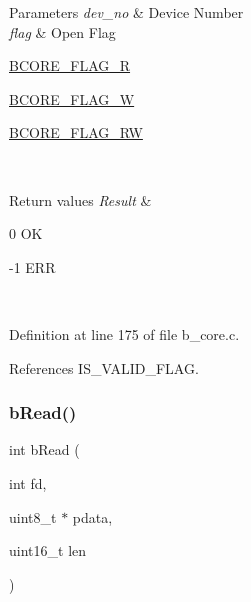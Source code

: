\begin{DoxyParams}{Parameters}
{\em dev\+\_\+no} & Device Number \\
\hline
{\em flag} & Open Flag \begin{DoxyItemize}
\item \mbox{\hyperlink{group___c_o_r_e___exported___defines_ga9632edfe3a6652c254922f0fc6e4315c}{B\+C\+O\+R\+E\+\_\+\+F\+L\+A\+G\+\_\+R}} \item \mbox{\hyperlink{group___c_o_r_e___exported___defines_ga5e134ab3ebc11db6d585cfc1a48aadf0}{B\+C\+O\+R\+E\+\_\+\+F\+L\+A\+G\+\_\+W}} \item \mbox{\hyperlink{group___c_o_r_e___exported___defines_ga0198147efa03609c64760662bd8ea00c}{B\+C\+O\+R\+E\+\_\+\+F\+L\+A\+G\+\_\+\+RW}} \end{DoxyItemize}
\\
\hline
\end{DoxyParams}

\begin{DoxyRetVals}{Return values}
{\em Result} & \begin{DoxyItemize}
\item 0 OK \item -\/1 E\+RR \end{DoxyItemize}
\\
\hline
\end{DoxyRetVals}


Definition at line 175 of file b\+\_\+core.\+c.



References I\+S\+\_\+\+V\+A\+L\+I\+D\+\_\+\+F\+L\+AG.

\mbox{\label{group___c_o_r_e___exported___functions_ga19ddb6f8ca523b3b28b74ea6a1519e3b}} 
\subsubsection{\texorpdfstring{b\+Read()}{bRead()}}
{\footnotesize\ttfamily int b\+Read (\begin{DoxyParamCaption}\item[{int}]{fd,  }\item[{uint8\+\_\+t $\ast$}]{pdata,  }\item[{uint16\+\_\+t}]{len }\end{DoxyParamCaption})}



